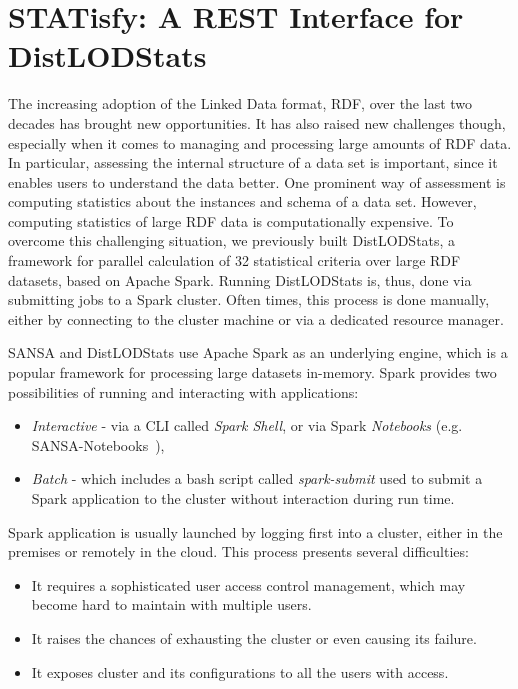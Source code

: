 \section{STATisfy: A REST Interface for DistLODStats}
\label{sec:distlodstats-statisfy}
The increasing adoption of the Linked Data format, \gls{RDF}, over the last two decades has brought new opportunities.
It has also raised new challenges though, especially when it comes to managing and processing large amounts of \gls{RDF} data.
In particular, assessing the internal structure of a data set is important, since it enables users to understand the data better.
One prominent way of assessment is computing statistics about the instances and schema of a data set.
However, computing statistics of large \gls{RDF} data is computationally expensive.
To overcome this challenging situation, we previously built DistLODStats, a framework for parallel calculation of 32 statistical criteria over large \gls{RDF} datasets, based on Apache Spark.
Running DistLODStats is, thus, done via submitting jobs to a Spark cluster.
Often times, this process is done manually, either by connecting to the cluster machine or via a dedicated resource manager. 

SANSA and DistLODStats use Apache Spark as an underlying engine, which is a popular framework for processing large datasets in-memory.
Spark provides two possibilities of running and interacting with applications: 
\begin{itemize}
    \item \textit{Interactive} - via a \gls{CLI} called \textit{Spark Shell}, or via Spark \textit{Notebooks} (e.g. SANSA-Notebooks~\cite{iermilov-2017-sansa-iswc-demo}),
    \item \textit{Batch} - which includes a bash script called \textit{spark-submit} used to submit a Spark application to the cluster without interaction during run time.
\end{itemize}

Spark application is usually launched by logging first into a cluster, either in the premises or remotely in the cloud. This process presents several difficulties:
\begin{itemize}
    \item It requires a sophisticated user access control management, which may become hard to maintain with multiple users.
    \item It raises the chances of exhausting the cluster or even causing its failure.
    \item It exposes cluster and its configurations to all the users with access.
\end{itemize}

